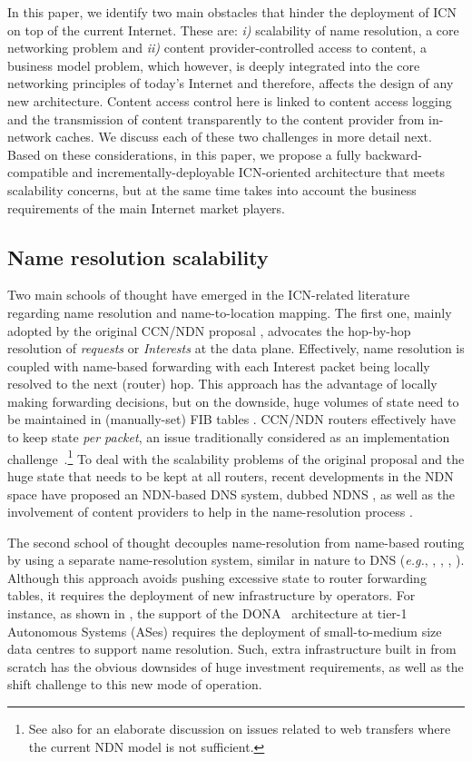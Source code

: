 \documentclass{sig-alternate}
\begin{document}
In this paper, we identify two main obstacles that hinder the deployment of ICN on top of the current Internet.
These are: \textit{i)} scalability of name resolution, a core networking problem \cite{caesar-ancs14} and \textit{ii)} content provider-controlled access to content, a business model problem, which however, is deeply integrated into the core networking principles of today's Internet and therefore, affects the design of any new architecture.
Content access control here is linked to content access logging and the transmission of content transparently to the content provider from in-network caches. 
We discuss each of these two challenges in more detail next.
Based on these considerations, in this paper, we propose a fully backward-compatible and incrementally-deployable ICN-oriented architecture that meets scalability concerns, but at the same time takes into account the business requirements of the main Internet market players.

\subsection{Name resolution scalability}

Two main schools of thought have emerged in the ICN-related literature regarding name resolution and name-to-location mapping.
The first one, mainly adopted by the original CCN/NDN proposal \cite{ccn}, advocates the hop-by-hop resolution of \textit{requests} or \textit{Interests} at the data plane. 
Effectively, name resolution is coupled with name-based forwarding with each Interest packet being locally resolved to the next (router) hop. This approach has the advantage of locally making forwarding decisions, but on the downside, huge volumes of state need to be maintained in (manually-set) FIB tables \cite{reality}.
CCN/NDN routers effectively have to keep state \textit{per packet}, an issue traditionally considered as an implementation challenge~\cite{tsiloInfocom}.\footnote{See also \cite{web-icn-oran} for an elaborate discussion on issues related to web transfers where the current NDN model is not sufficient.}
To deal with the scalability problems \cite{networking15} of the original proposal and the huge state that needs to be kept at all routers, recent developments in the NDN space have proposed an NDN-based DNS system, dubbed NDNS \cite{afanasyev-phd}, as well as the involvement of content providers to help in the name-resolution process \cite{snamp-gi15}.

The second school of thought decouples name-resolution from name-based routing by using a separate name-resolution system, similar in nature to DNS (\textit{e.g.}, \cite{netinf-comcom}, \cite{curling}, \cite{tyson-juno}, \cite{pursuitnrs}). Although this approach avoids pushing excessive state to router forwarding tables, it requires the deployment of new infrastructure by operators. For instance, as shown in \cite{networking15}, the support of the DONA~\cite{dona} architecture at tier-1 Autonomous Systems (ASes) requires the deployment of small-to-medium size data centres to support name resolution. Such, extra infrastructure built in from scratch has the obvious downsides of huge investment requirements, as well as the shift challenge to this new mode of operation.
\end{document}
